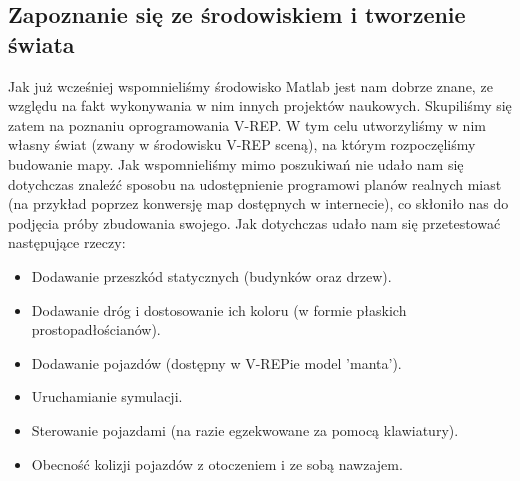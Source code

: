 \documentclass[11pt, a4paper, twoside]{article}
\begin{document}
\subsection{Zapoznanie się ze środowiskiem i tworzenie świata}
\label{subsec:scena}
Jak już wcześniej wspomnieliśmy środowisko Matlab jest nam dobrze znane, ze względu na fakt wykonywania w nim innych projektów naukowych. Skupiliśmy się zatem na poznaniu oprogramowania V-REP. W tym celu utworzyliśmy w nim własny świat (zwany w środowisku V-REP sceną), na którym rozpoczęliśmy budowanie mapy. Jak wspomnieliśmy mimo poszukiwań nie udało nam się dotychczas znaleźć sposobu na udostępnienie programowi planów realnych miast (na przykład poprzez konwersję map dostępnych w internecie), co skłoniło nas do podjęcia próby zbudowania swojego. Jak dotychczas udało nam się przetestować następujące rzeczy:
\begin{itemize}
	\item Dodawanie przeszkód statycznych (budynków oraz drzew).
	\item Dodawanie dróg i dostosowanie ich koloru (w formie płaskich prostopadłościanów).
	\item Dodawanie pojazdów (dostępny w V-REPie model 'manta').
	\item Uruchamianie symulacji.
	\item Sterowanie pojazdami (na razie egzekwowane za pomocą klawiatury).
	\item Obecność kolizji pojazdów z otoczeniem i ze sobą nawzajem.
\end{itemize}
\end{document}
